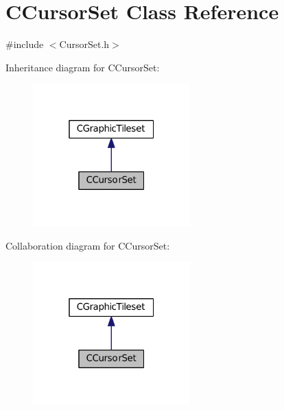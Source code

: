 \hypertarget{classCCursorSet}{}\section{C\+Cursor\+Set Class Reference}
\label{classCCursorSet}


{\ttfamily \#include $<$Cursor\+Set.\+h$>$}



Inheritance diagram for C\+Cursor\+Set\+:
\nopagebreak
\begin{figure}[H]
\begin{center}
\leavevmode
\includegraphics[width=172pt]{classCCursorSet__inherit__graph}
\end{center}
\end{figure}


Collaboration diagram for C\+Cursor\+Set\+:
\nopagebreak
\begin{figure}[H]
\begin{center}
\leavevmode
\includegraphics[width=172pt]{classCCursorSet__coll__graph}
\end{center}
\end{figure}
